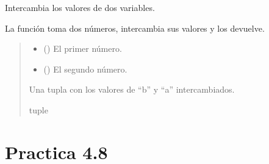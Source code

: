 \documentclass[letterpaper,10pt,spanish]{sphinxmanual}
\begin{document}
\begin{fulllineitems}
\label{\detokenize{pr4:pr4.7.intercambiar_valores}}
\pysigstartsignatures
{}
\pysigstopsignatures
\sphinxAtStartPar
Intercambia los valores de dos variables.

\sphinxAtStartPar
La función toma dos números, intercambia sus valores y los devuelve.
\begin{quote}\begin{description}
\begin{itemize}
\item {} 
\sphinxAtStartPar
{} () \textendash{} El primer número.

\item {} 
\sphinxAtStartPar
{} () \textendash{} El segundo número.

\end{itemize}

\sphinxAtStartPar
Una tupla con los valores de “b” y “a” intercambiados.

\sphinxAtStartPar
tuple

\end{description}\end{quote}

\end{fulllineitems}



\section{Practica 4.8}
\label{\detokenize{pr4:module-pr4.8}}\label{\detokenize{pr4:practica-4-8}}
\end{document}
